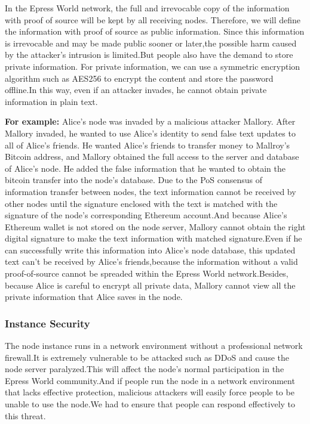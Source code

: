 \documentclass{article}
\begin{document}
    In the Epress World network, the full and irrevocable copy of the information with proof of source will be kept  by all receiving nodes. Therefore, we will define the information with proof of source as public information. Since this information is irrevocable and may be made public sooner or later,the possible harm caused by the attacker's intrusion is limited.But people also have the demand to store private information. For private information, we can use a symmetric encryption algorithm such as AES256 to encrypt the content and store the password offline.In this way, even if an attacker invades, he cannot obtain private information in plain text.
    ~\newline
    \begin{blockqt}
    \textbf{For example: }Alice's node was invaded by a malicious attacker Mallory. After Mallory invaded, he wanted to use Alice's identity to send false text updates to all of Alice's friends. He wanted  Alice's friends to  transfer money to Mallroy's Bitcoin address, and Mallory obtained the full access to the server and database of Alice's node. He added the false information that he wanted to obtain the bitcoin transfer into the node's database. Due to the PoS consensus of information transfer between nodes, the text information cannot be received by other nodes until the signature enclosed with the text is matched with the signature of the node's corresponding Ethereum account.And because Alice's Ethereum wallet is not stored on the node server, Mallory cannot obtain the right digital signature to make the text information with matched signature.Even if he can successfully write this information into Alice's node database, this updated text can't be received by Alice's friends,because the information without a valid proof-of-source cannot be spreaded within the Epress World network.Besides, because Alice is careful to encrypt all private data, Mallory cannot view all the private information that Alice saves in the node. 
    \end{blockqt}
\subsubsection{Instance Security}
    The node instance runs in a network environment without a professional network firewall.It is extremely vulnerable to be attacked such as DDoS and cause the node server paralyzed.This will affect the node's normal participation in the Epress World community.And if people run the node in a network environment that lacks effective protection, malicious attackers will easily force people to be unable to use the node.We had to ensure that people can respond effectively to this threat.
\end{document}

